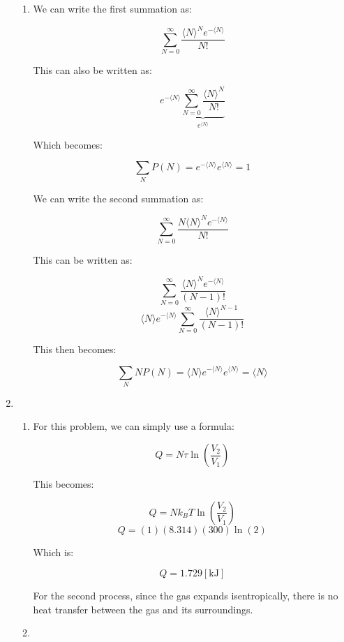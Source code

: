 \begin{enumerate}
\begin{enumerate}
      \item 

        We can write the first summation as:

        $$\sum_{N=0}^\infty\frac{\langle N\rangle^Ne^{-\langle N\rangle}}{N!}$$

        This can also be written as:

        $$e^{-\langle N\rangle}\underbrace{\sum_{N=0}^\infty\frac{\langle N\rangle^N}{N!}}_{e^{\langle N\rangle}}$$

        Which becomes:

        $$\boxed{\sum_N P(N)=e^{-\langle N\rangle}e^{\langle N\rangle}=1}$$

        We can write the second summation as:

        $$\sum_{N=0}^\infty\frac{N\langle N\rangle^Ne^{-\langle N\rangle}}{N!}$$

        This can be written as:

        $$\sum_{N=0}^\infty\frac{\langle N\rangle^Ne^{-\langle N\rangle}}{(N-1)!}$$
        $$\langle N\rangle e^{-\langle N\rangle}\sum_{N=0}^\infty\frac{\langle N\rangle^{N-1}}{(N-1)!}$$

        This then becomes:

        $$\boxed{\sum_N NP(N)=\langle N\rangle e^{-\langle N\rangle}e^{\langle N\rangle}=\langle N\rangle}$$

    \end{enumerate}

  \item

    \begin{enumerate}

      \item 

        For this problem, we can simply use a formula:

        $$Q=N\tau\ln\left( \frac{V_2}{V_1} \right)$$

        This becomes:

        $$Q=Nk_BT\ln\left( \frac{V_2}{V_1} \right)$$
        $$Q=(1)(8.314)(300)\ln(2)$$

        Which is:

        $$\boxed{Q=1.729[\si{\kilo\joule}]}$$

        For the second process, since the gas expands isentropically, there is no heat transfer between the gas and its surroundings.

      \item 


\end{enumerate}
\end{enumerate}
